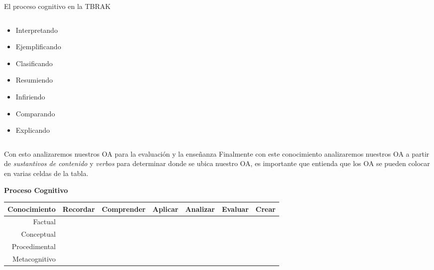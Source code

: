 \documentclass[11pt, aspectratio=169, xcolor=table,hyphens]{beamer}
\begin{document}
\begin{frame}{El proceso cognitivo en la TBRAK}
\begin{columns}
\begin{column}{.5\linewidth}
{\begin{block}
\begin{itemize}
						\item<5-> Interpretando
						\item<6-> Ejemplificando
						\item<7-> Clasificando
						\item<8-> Resumiendo
						\item<9-> Infiriendo
						\item<10-> Comparando
						\item<11-> Explicando
					\end{itemize}
				\end{block}}
			\end{column}
		\end{columns}
	\end{frame}

	\begin{frame}{Con esto analizaremos nuestros OA para la evaluación y la enseñanza}
		\justifying
		Finalmente con este conocimiento analizaremos nuestros OA a partir de \textit{sustantivos de contenido} y \textit{verbos} para determinar donde se ubica nuestro OA, es importante que entienda que los OA se pueden colocar en varias celdas de la tabla.
		\begin{center}
			\textbf{Proceso Cognitivo}
			\begin{tabular}{r|c|c|c|c|c|c}
				\hline
				 \textbf{Conocimiento} & Recordar & Comprender & Aplicar & Analizar & Evaluar & Crear \\
				\hline
				 Factual &  &  &  &  &  &  \\
				\hline
				Conceptual &  &  &  &  &  &  \\
				\hline
				 Procedimental &  &  &  &  &  &  \\
				\hline
				Metacognitivo &  &  &  &  &  &  \\
				\hline
			\end{tabular}
		\end{center}
	\end{frame}
\end{document}
